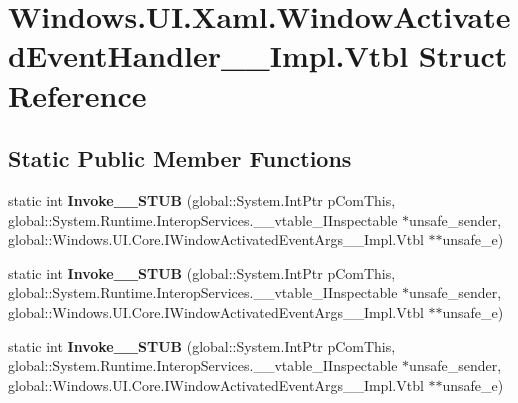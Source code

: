 \hypertarget{struct_windows_1_1_u_i_1_1_xaml_1_1_window_activated_event_handler_____impl_1_1_vtbl}{}\section{Windows.\+U\+I.\+Xaml.\+Window\+Activated\+Event\+Handler\+\_\+\+\_\+\+Impl.\+Vtbl Struct Reference}
\label{struct_windows_1_1_u_i_1_1_xaml_1_1_window_activated_event_handler_____impl_1_1_vtbl}
\subsection*{Static Public Member Functions}
\begin{DoxyCompactItemize}
\item 
\mbox{\label{struct_windows_1_1_u_i_1_1_xaml_1_1_window_activated_event_handler_____impl_1_1_vtbl_a9cc35c51117e2c1136e245138889f24e}} 
static int {\bfseries Invoke\+\_\+\+\_\+\+S\+T\+UB} (global\+::\+System.\+Int\+Ptr p\+Com\+This, global\+::\+System.\+Runtime.\+Interop\+Services.\+\_\+\+\_\+vtable\+\_\+\+I\+Inspectable $\ast$unsafe\+\_\+sender, global\+::\+Windows.\+U\+I.\+Core.\+I\+Window\+Activated\+Event\+Args\+\_\+\+\_\+\+Impl.\+Vtbl $\ast$$\ast$unsafe\+\_\+e)
\item 
\mbox{\label{struct_windows_1_1_u_i_1_1_xaml_1_1_window_activated_event_handler_____impl_1_1_vtbl_a9cc35c51117e2c1136e245138889f24e}} 
static int {\bfseries Invoke\+\_\+\+\_\+\+S\+T\+UB} (global\+::\+System.\+Int\+Ptr p\+Com\+This, global\+::\+System.\+Runtime.\+Interop\+Services.\+\_\+\+\_\+vtable\+\_\+\+I\+Inspectable $\ast$unsafe\+\_\+sender, global\+::\+Windows.\+U\+I.\+Core.\+I\+Window\+Activated\+Event\+Args\+\_\+\+\_\+\+Impl.\+Vtbl $\ast$$\ast$unsafe\+\_\+e)
\item 
\mbox{\label{struct_windows_1_1_u_i_1_1_xaml_1_1_window_activated_event_handler_____impl_1_1_vtbl_a9cc35c51117e2c1136e245138889f24e}} 
static int {\bfseries Invoke\+\_\+\+\_\+\+S\+T\+UB} (global\+::\+System.\+Int\+Ptr p\+Com\+This, global\+::\+System.\+Runtime.\+Interop\+Services.\+\_\+\+\_\+vtable\+\_\+\+I\+Inspectable $\ast$unsafe\+\_\+sender, global\+::\+Windows.\+U\+I.\+Core.\+I\+Window\+Activated\+Event\+Args\+\_\+\+\_\+\+Impl.\+Vtbl $\ast$$\ast$unsafe\+\_\+e)
$$
\end{DoxyCompactItemize}
